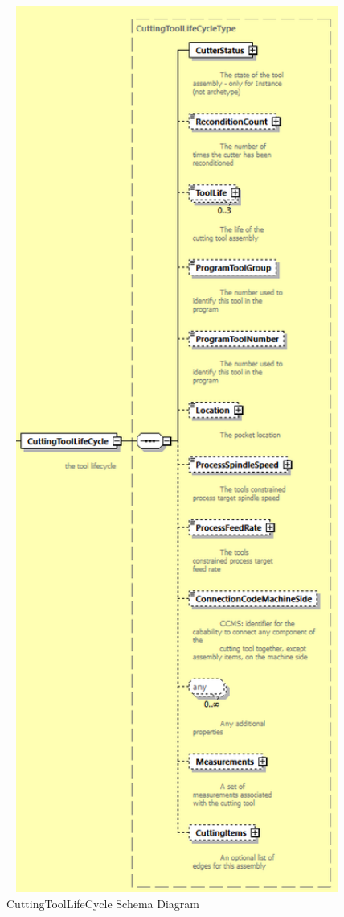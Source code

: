 \begin{figure}[ht]
  \centering
    \includegraphics[width=1.0\textwidth]{figures/CuttingToolLifeCycle Schema.png}
  \caption{CuttingToolLifeCycle Schema Diagram}
  \label{fig:CuttingToolLifeCycle Schema Diagram}
\end{figure}

